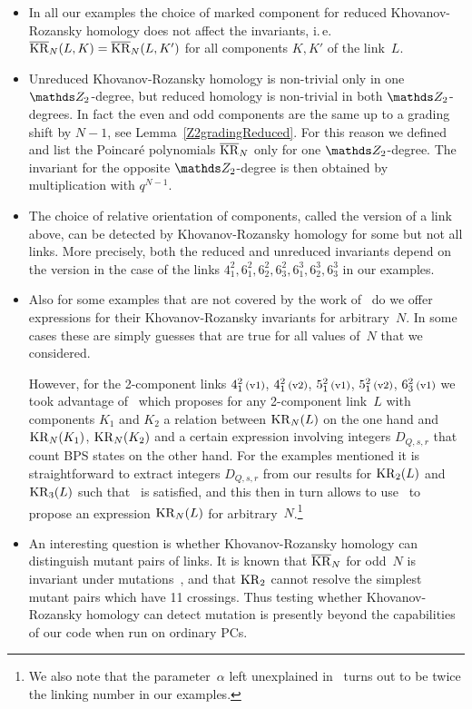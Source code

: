 \documentclass{compositio}
\theoremstyle{definition}
\numberwithin{equation}{section}
\begin{document}
\begin{itemize}
\item 
In all our examples the choice of marked component for reduced Khovanov-Rozansky homology does not affect the invariants, i.\,e.~$\overline{\operatorname{KR}}_{N}(L,K) = \overline{\operatorname{KR}}_{N}(L,K')$ for all components $K,K'$ of the link~$L$. 
\item 
Unreduced Khovanov-Rozansky homology is non-trivial only in one $\nZ_{2}$-degree, but reduced homology is non-trivial in both $\nZ_{2}$-degrees. In fact the even and odd components are the same up to a grading shift by $N-1$, see Lemma~\ref{Z2gradingReduced}. For this reason we defined and list the Poincar\'e polynomials $\overline{\operatorname{KR}}_{N}$ only for one $\nZ_{2}$-degree. The invariant for the opposite $\nZ_{2}$-degree is then obtained by multiplication with $q^{N-1}$. 
\item 
The choice of relative orientation of components, called the version of a link above, can be detected by Khovanov-Rozansky homology for some but not all links. More precisely, both the reduced and unreduced invariants depend on the version in the case of the links $4_{1}^2, 6_{1}^2, 6_{2}^2, 6_{3}^2, 6_{1}^3, 6_{2}^3, 6_{3}^3$ in our examples. 
\item 
Also for some examples that are not covered by the work of~\cite{r0508510, r0607544} do we offer expressions for their Khovanov-Rozansky invariants for arbitrary~$N$. In some cases these are simply guesses that are true for all values of~$N$ that we considered. 

However, for the 2-component links $4_{1}^2\,\text{{\footnotesize (v1)}}$, $4_{1}^2\,\text{{\footnotesize (v2)}}$, $5_{1}^2\,\text{{\footnotesize (v1)}}$, $5_{1}^2\,\text{{\footnotesize (v2)}}$, $6_{3}^2\,\text{{\footnotesize (v1)}}$ we took advantage of~\cite[Eq.\,(5.5)]{gsv0412243} which proposes for any 2-component link~$L$ with components $K_{1}$ and $K_{2}$ a relation between $\operatorname{KR}_{N}(L)$ on the one hand and $\operatorname{KR}_N(K_{1})$, $\operatorname{KR}_N(K_{2})$ and a certain expression involving integers $D_{Q,s,r}$ that count BPS states on the other hand. For the examples mentioned it is straightforward to extract integers $D_{Q,s,r}$ from our results for $\operatorname{KR}_{2}(L)$ and $\operatorname{KR}_{3}(L)$ such that~\cite[Eq.\,(5.5)]{gsv0412243} is satisfied, and this then in turn allows to use~\cite[Eq.\,(5.5)]{gsv0412243} to propose an expression $\operatorname{KR}_{N}(L)$ for arbitrary~$N$.\footnote{We also note that the parameter~$\alpha$ left unexplained in~\cite{gsv0412243} turns out to be twice the linking number in our examples.}
\item 
An interesting question is whether Khovanov-Rozansky homology can distinguish mutant pairs of links. It is known that $\overline{\operatorname{KR}}_{N}$ for odd~$N$ is invariant under mutations~\cite{j1101.3302}, and that $\operatorname{KR}_{2}$ cannot resolve the simplest mutant pairs which have 11 crossings. Thus testing whether Khovanov-Rozansky homology can detect mutation is presently beyond the capabilities of our code when run on ordinary PCs. 
\end{itemize}
\end{document}

